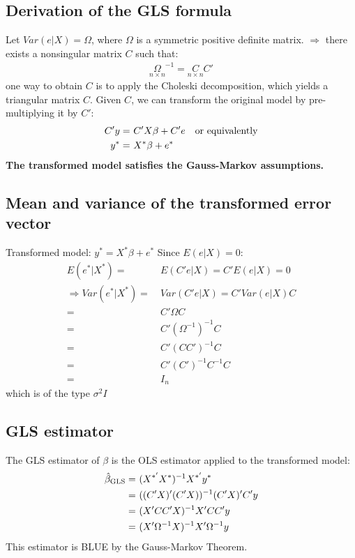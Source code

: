 \documentclass[a4paper,twoside,11pt]{article}
\begin{document}
\subsection{Derivation of the GLS formula}
Let $Var(e|X)= \Omega$, where \textcolor{NavyBlue}{$\Omega$ is a symmetric positive definite matrix.}
\newline
\newline
$\Rightarrow$ there exists a \textcolor{NavyBlue}{nonsingular matrix $C$} such that:
\begin{equation*}
\begin{aligned}
\underset{n \times n}{\Omega}^{-1} = \underset{n \times n}{C}C'
\end{aligned} 
\end{equation*}
one way to obtain $C$ is to apply the Choleski decomposition, which yields a triangular matrix $C$.
\newline
\newline
Given $C$, we can transform the original model by pre-multiplying it by $C'$:
\begin{equation*}
\begin{aligned}
C'y =& \ C' X \beta + C'e \ \ \ \textmd{or equivalently} \\
y^* =& \ X^* \beta + e^*
\end{aligned} 
\end{equation*}
\textbf{The transformed model satisfies the Gauss-Markov assumptions.}
\subsection{Mean and variance of the transformed error vector}
Transformed model: $y^* = X^* \beta + e^*$ 
\newline
Since $E(e|X)=0:$ 
\begin{equation*}
\begin{aligned}
E(e^*|X^*) =& \  E(C'e|X) = C'E(e|X) = 0 \\ 
\Rightarrow Var(e^* | X^*) =& \ Var(C'e|X) = C'Var(e|X)C \\
=& \ C' \Omega C \\
=& \ C'(\Omega^{-1})^{-1} C \\
=& \ C' (CC')^{-1} C \\
=& \ C'(C')^{-1} C^{-1} C \\
=& \ I_n
\end{aligned} 
\end{equation*}
which is of the type $\sigma^2 I$
\subsection{GLS estimator}
The GLS estimator of $\beta$ is the OLS estimator applied to the transformed model:
\begin{equation*}
\begin{aligned}
\hat{\beta}_{\textmd{GLS}}=& \ (X^{*'} X^*)^{-1} X^{*'} y^* \\
=& \ ((C'X)' (C'X))^{-1} (C'X)'C'y \\
=& \ (X'CC'X)^{-1} X'CC'y \\
=& \ (X' \Omega^{-1} X)^{-1} X' \Omega^{-1} y
\end{aligned} 
\end{equation*}
This estimator is BLUE by the Gauss-Markov Theorem.
\end{document}
